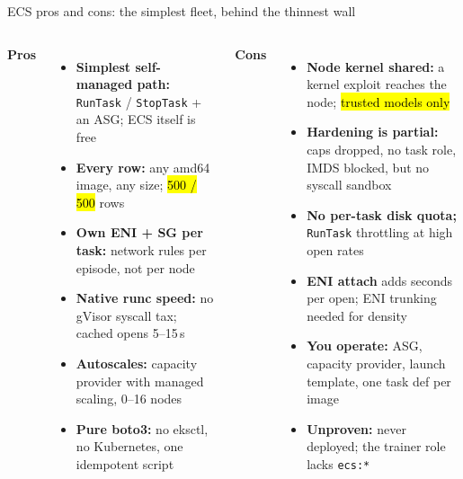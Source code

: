 \begin{frame}{ECS pros and cons: the simplest fleet, behind the thinnest wall}
\begin{columns}[T]
{\small\bfseries\color{awsteal}Pros\par}\vspace{1mm}
\begin{itemize}\scriptsize\setlength{\itemsep}{1.2mm}
\item[\yes] \textbf{Simplest self-managed path:} \texttt{RunTask} / \texttt{StopTask} + an ASG; ECS itself is free
\item[\yes] \textbf{Every row:} any amd64 image, any size; \hl{500 / 500} rows
\item[\yes] \textbf{Own ENI + SG per task:} network rules per episode, not per node
\item[\yes] \textbf{Native runc speed:} no gVisor syscall tax; cached opens 5--15\,s\est
\item[\yes] \textbf{Autoscales:} capacity provider with managed scaling, 0--16 nodes
\item[\yes] \textbf{Pure boto3:} no eksctl, no Kubernetes, one idempotent script
\end{itemize}
{\small\bfseries\color{awsmagenta}Cons\par}\vspace{1mm}
\begin{itemize}\scriptsize\setlength{\itemsep}{1.2mm}
\item[\no] \textbf{Node kernel shared:} a kernel exploit reaches the node; \hl{trusted models only}
\item[\no] \textbf{Hardening is partial:} caps dropped, no task role, IMDS blocked, but no syscall sandbox
\item[\no] \textbf{No per-task disk quota;} \texttt{RunTask} throttling at high open rates
\item[\no] \textbf{ENI attach} adds seconds per open; ENI trunking needed for density
\item[\no] \textbf{You operate:} ASG, capacity provider, launch template, one task def per image
\item[\no] \textbf{Unproven:} never deployed; the trainer role lacks \texttt{ecs:*}
\end{itemize}
\end{columns}
\par\vspace{2mm}
\end{frame}

